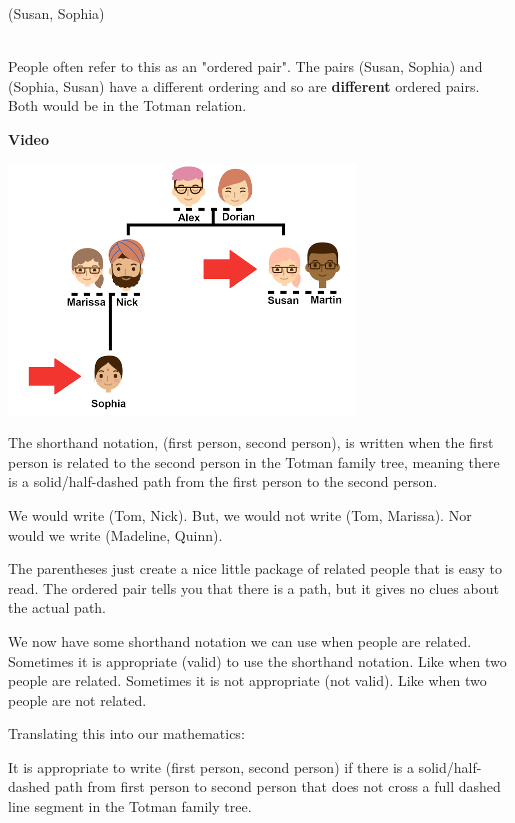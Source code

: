 \documentclass{ximera}
\begin{document}
\begin{notation}
\begin{center}
(Susan, Sophia) 
\end{center}
\end{notation}
\quad \\


People often refer to this as an "ordered pair".  The pairs (Susan, Sophia) and (Sophia, Susan) have a different ordering and so are \textbf{different} ordered pairs. Both would be in the Totman relation.

\begin{explanation} 
\textbf{Video}
\begin{center}
\includegraphics{pics/Sophia_Susan.png}
\end{center}
\end{explanation}
 
The shorthand notation, (first person, second person), is written when the first person is related to the second person in the Totman family tree, meaning there is a solid/half-dashed path from the first person to the second person.

We would write (Tom, Nick). But, we would not write (Tom, Marissa).  Nor would we write (Madeline, Quinn).  

The parentheses just create a nice little package of related people that is easy to read. The ordered pair tells you that there is a path, but it gives no clues about the actual path.

We now have some shorthand notation we can use when people are related. Sometimes it is appropriate (valid) to use the shorthand notation.  Like when two people are related.  Sometimes it is not appropriate (not valid).  Like when two people are not related.

Translating this into our mathematics: 

\begin{explanation}
It is appropriate to write (first person, second person) if there is a solid/half-dashed path from first person to second person that does not cross a full dashed line segment in the Totman family tree. 
\end{explanation}
\quad \\
\end{document}
